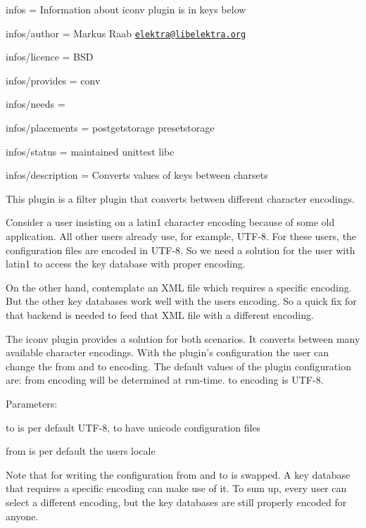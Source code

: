 
\begin{DoxyItemize}
\item infos = Information about iconv plugin is in keys below
\item infos/author = Markus Raab \href{mailto:elektra@libelektra.org}{\tt elektra@libelektra.\+org}
\item infos/licence = B\+SD
\item infos/provides = conv
\item infos/needs =
\item infos/placements = postgetstorage presetstorage
\item infos/status = maintained unittest libc
\item infos/description = Converts values of keys between charsets
\end{DoxyItemize}

This plugin is a filter plugin that converts between different character encodings.

Consider a user insisting on a {\ttfamily latin1} character encoding because of some old application. All other users already use, for example, {\ttfamily U\+T\+F-\/8}. For these users, the configuration files are encoded in {\ttfamily U\+T\+F-\/8}. So we need a solution for the user with {\ttfamily latin1} to access the key database with proper encoding.

On the other hand, contemplate an X\+ML file which requires a specific encoding. But the other key databases work well with the users encoding. So a quick fix for that backend is needed to feed that X\+ML file with a different encoding.

The iconv plugin provides a solution for both scenarios. It converts between many available character encodings. With the plugin’s configuration the user can change the from and to encoding. The default values of the plugin configuration are\+: {\ttfamily from} encoding will be determined at run-\/time. {\ttfamily to} encoding is {\ttfamily U\+T\+F-\/8}.

Parameters\+:


\begin{DoxyItemize}
\item {\ttfamily to} is per default U\+T\+F-\/8, to have unicode configuration files
\item {\ttfamily from} is per default the users locale
\end{DoxyItemize}

Note that for writing the configuration {\ttfamily from} and {\ttfamily to} is swapped. A key database that requires a specific encoding can make use of it. To sum up, every user can select a different encoding, but the key databases are still properly encoded for anyone.

